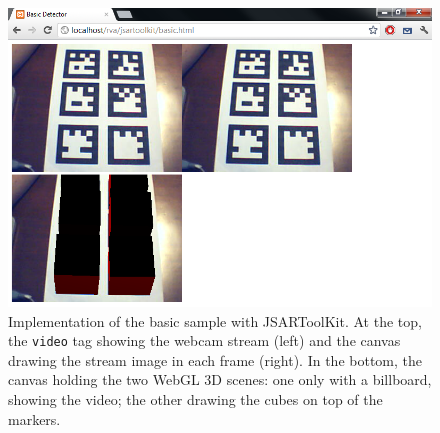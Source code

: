 \begin{figure}[p]
	\begin{center}
		\includegraphics[width=\columnwidth]{report/images/basic.png}
	\end{center}
	\caption[Basic Sample]{Implementation of the basic sample with JSARToolKit. At the top, the \texttt{video} tag showing the webcam stream (left) and the canvas drawing the stream image in each frame (right). In the bottom, the canvas holding the two WebGL 3D scenes: one only with a billboard, showing the video; the other drawing the cubes on top of the markers.}
	\label{fig:basic}
\end{figure}

